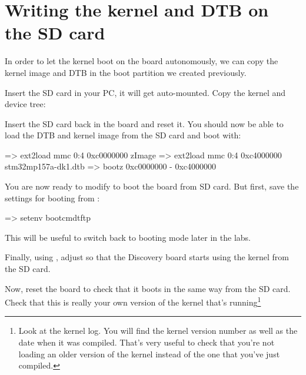 \section{Writing the kernel and DTB on the SD card}

In order to let the kernel boot on the board autonomously, we can
copy the kernel image and DTB in the boot partition we created
previously.

Insert the SD card in your PC, it will get auto-mounted. Copy the
kernel and device tree:

\normalsize

Insert the SD card back in the board and reset it. You should now be
able to load the DTB and kernel image from the SD card and boot with:

\begin{ubootinput}
=> ext2load mmc 0:4 0xc0000000 zImage
=> ext2load mmc 0:4 0xc4000000 stm32mp157a-dk1.dtb
=> bootz 0xc0000000 - 0xc4000000
\end{ubootinput}

You are now ready to modify  to boot the board
from SD card. But first, save the settings for booting from
:

\begin{ubootinput}
=> setenv bootcmdtftp %
\end{ubootinput}

This will be useful to switch back to  booting mode
later in the labs.

Finally, using , adjust  so that
the Discovery board starts using the kernel from the SD card.

Now, reset the board to check that it boots in the same way from the
SD card. Check that this is really your own version of the kernel
that's running\footnote{Look at the kernel log. You will find the
kernel version number as well as the date when it was compiled.
That's very useful to check that you're not loading an older version
of the kernel instead of the one that you've just compiled.}

